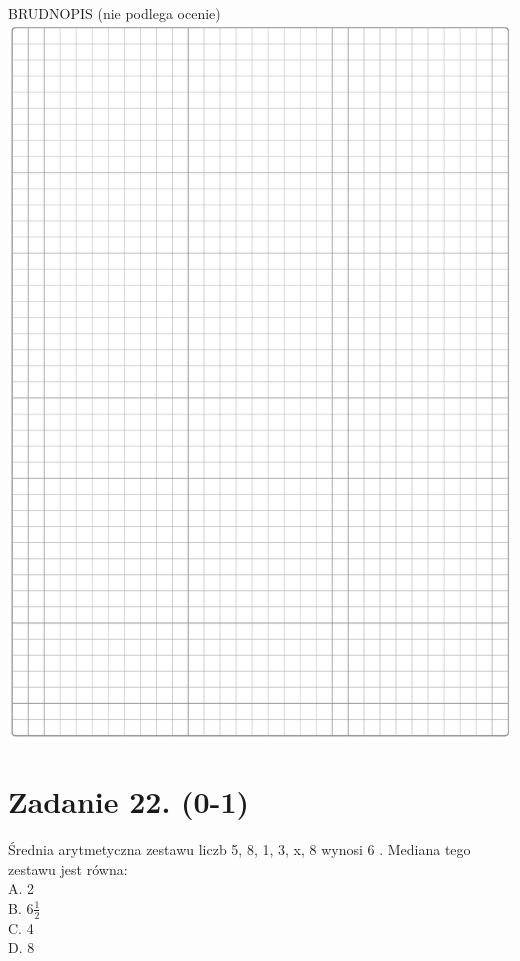 \documentclass[10pt]{article}
\begin{document}
BRUDNOPIS (nie podlega ocenie)\\
\includegraphics[max width=\textwidth, center]{2024_11_21_724abc2cf5a71562f5b2g-07}

\section*{Zadanie 22. (0-1)}
Średnia arytmetyczna zestawu liczb 5, 8, 1, 3, x, 8 wynosi 6 . Mediana tego zestawu jest równa:\\
A. 2\\
B. \(6 \frac{1}{2}\)\\
C. 4\\
D. 8
\end{document}
